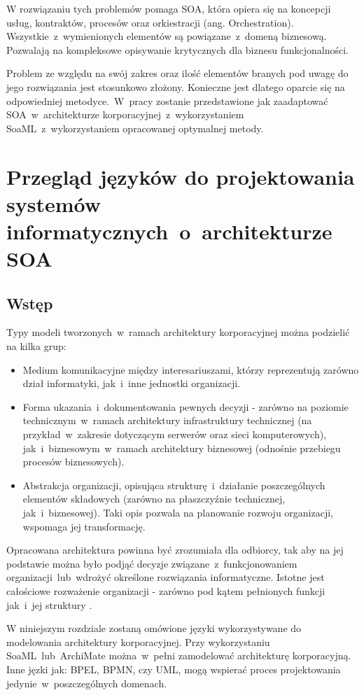 W rozwiązaniu tych problemów pomaga SOA, która opiera się na koncepcji usług, kontraktów, procesów oraz orkiestracji (ang. Orchestration). Wszystkie~z~wymienionych elementów są powiązane~z~domeną biznesową. Pozwalają na kompleksowe opisywanie krytycznych dla biznesu funkcjonalności. 

Problem ze względu na swój zakres oraz ilość elementów branych pod uwagę do jego rozwiązania jest stosunkowo złożony. Konieczne jest dlatego oparcie się na odpowiedniej metodyce.~W~pracy zostanie przedstawione jak zaadaptować SOA~w~architekturze korporacyjnej~z~wykorzystaniem SoaML~z~wykorzystaniem opracowanej optymalnej metody.

\chapter{Przegląd języków do projektowania systemów informatycznych~o~architekturze SOA}

\section{Wstęp}
Typy modeli tworzonych~w~ramach architektury korporacyjnej można podzielić na kilka grup:
\begin{itemize}
\item{Medium komunikacyjne między interesariuszami, którzy reprezentują zarówno dział informatyki, jak~i~inne jednostki organizacji.}
\item{Forma ukazania~i~dokumentowania pewnych decyzji - zarówno na poziomie technicznym~w~ramach architektury infrastruktury technicznej (na przykład~w~zakresie dotyczącym serwerów oraz sieci komputerowych), jak~i~biznesowym~w~ramach architektury biznesowej (odnośnie przebiegu procesów biznesowych).}
\item{Abstrakcja organizacji, opisująca strukturę~i~działanie poszczególnych elementów składowych (zarówno na płaszczyźnie technicznej, jak~i~biznesowej). Taki opis pozwala na planowanie rozwoju organizacji, wspomaga jej transformację.}
\end{itemize}

Opracowana architektura powinna być zrozumiała dla odbiorcy, tak aby na jej podstawie można było podjąć decyzje związane~z~funkcjonowaniem organizacji~lub~wdrożyć określone rozwiązania informatyczne. Istotne jest całościowe rozważenie organizacji - zarówno pod kątem pełnionych funkcji jak~i~jej struktury \cite{ArchKorpSob}.

W niniejszym rozdziale zostaną omówione języki wykorzystywane do modelowania architektury korporacyjnej. Przy wykorzystaniu SoaML~lub~ArchiMate można~w~pełni zamodelować architekturę korporacyjną. Inne jęzki jak: BPEL, BPMN, czy UML, mogą wspierać proces projektowania jedynie~w~poszczególnych domenach.

